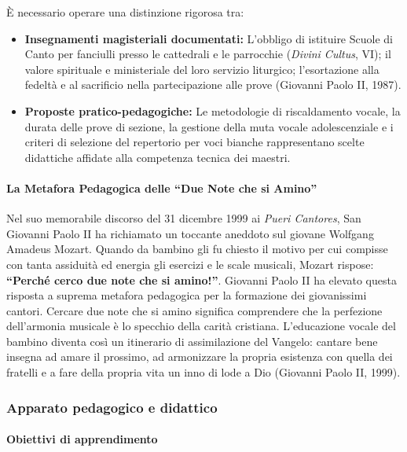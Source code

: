 \documentclass[12pt,a4paper]{article}
\begin{document}
	È necessario operare una distinzione rigorosa tra:
	
	\begin{itemize}[leftmargin=*]
		\item \textbf{Insegnamenti magisteriali documentati:} L'obbligo di istituire Scuole di Canto per fanciulli presso le cattedrali e le parrocchie (\emph{Divini Cultus}, VI); il valore spirituale e ministeriale del loro servizio liturgico; l'esortazione alla fedeltà e al sacrificio nella partecipazione alle prove (Giovanni Paolo II, 1987).
		\item \textbf{Proposte pratico-pedagogiche:} Le metodologie di riscaldamento vocale, la durata delle prove di sezione, la gestione della muta vocale adolescenziale e i criteri di selezione del repertorio per voci bianche rappresentano scelte didattiche affidate alla competenza tecnica dei maestri.
	\end{itemize}
	
	\paragraph{La Metafora Pedagogica delle ``Due Note che si Amino''}\label{la-metafora-pedagogica-delle-due-note-che-si-amino}
	
	Nel suo memorabile discorso del 31 dicembre 1999 ai \emph{Pueri Cantores}, San Giovanni Paolo II ha richiamato un toccante aneddoto sul giovane Wolfgang Amadeus Mozart. Quando da bambino gli fu chiesto il motivo per cui compisse con tanta assiduità ed energia gli esercizi e le scale musicali, Mozart rispose: \textbf{``Perché cerco due note che si amino!''}. Giovanni Paolo II ha elevato questa risposta a suprema metafora pedagogica per la formazione dei giovanissimi cantori. Cercare due note che si amino significa comprendere che la perfezione dell'armonia musicale è lo specchio della carità cristiana. L'educazione vocale del bambino diventa così un itinerario di assimilazione del Vangelo: cantare bene insegna ad amare il prossimo, ad armonizzare la propria esistenza con quella dei fratelli e a fare della propria vita un inno di lode a Dio (Giovanni Paolo II, 1999).
	
	\subsubsection{Apparato pedagogico e didattico}\label{apparato-pedagogico-e-didattico-11}
	
	\paragraph{Obiettivi di apprendimento}\label{obiettivi-di-apprendimento-11}
	
\end{document}
